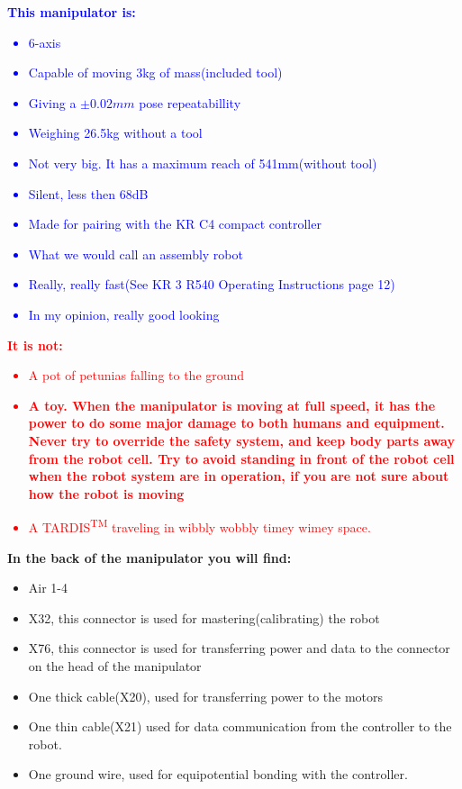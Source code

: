 \documentclass{article}
\begin{document}
   
    \newpage
    \textcolor{blue}{\textbf{This manipulator is:}
    \begin{itemize}
        \item 6-axis
        \item Capable of moving 3kg of mass(included tool)
        \item Giving a $\pm 0.02mm$ pose repeatabillity
        \item Weighing 26.5kg without a tool
        \item Not very big. It has a maximum reach of 541mm(without tool)
        \item Silent, less then 68dB
        \item Made for pairing with the KR C4 compact controller
        \item What we would call an assembly robot
        \item Really, really fast(See KR 3 R540 Operating Instructions page 12)
        \item In my opinion, really good looking
    \end{itemize}}

    \textcolor{red}{\textbf{It is not:}
    \begin{itemize}
        \item A pot of petunias falling to the ground
        \item \textbf{A toy. When the manipulator is moving at full speed, it has the power to do some major damage to both humans and equipment. Never try to override the safety system, and keep body parts away from the robot cell. Try to avoid standing in front of the robot cell when the robot system are in operation, if you are not sure about how the robot is moving}
         \item A TARDIS\textsuperscript{TM} traveling in wibbly wobbly          timey wimey space. 
    \end{itemize}}

     \textbf{In the back of the manipulator you will find:}
    \begin{itemize}
        \item Air 1-4
        \item X32, this connector is used for mastering(calibrating) the robot
        \item X76, this connector is used for transferring power and data to the connector on the head of the manipulator
        \item One thick cable(X20), used for transferring power to the motors
        \item One thin cable(X21) used for data communication from the controller to the robot. 
        \item One ground wire, used for equipotential bonding with the controller. 
    \end{itemize}
    
\end{document}

